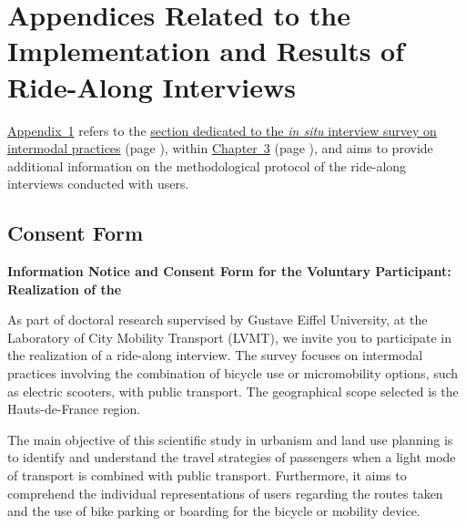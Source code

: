     \setcounter{section}{0}
\chapter{Appendices Related to the Implementation and Results of Ride-Along Interviews}
    \label{annexes:parcours-commentes}

\hyperref[annexes:parcours-commentes]{Appendix~\ref{annexes:parcours-commentes}} refers to the \hyperref[chap3:parcours-commente]{section dedicated to the \textsl{in situ} interview survey on intermodal practices} (page \pageref{chap3:parcours-commente}), within \hyperref[chap3:titre]{Chapter~3} (page \pageref{chap3:titre}), and aims to provide additional information on the methodological protocol of the ride-along interviews conducted with users.%

    \setcounter{tocdepth}{2}
    \renewcommand{\localcontentsname}{Structure of Appendix~\ref{annexes:parcours-commentes}}
\localtableofcontents

    \newpage
\section{Consent Form}
    \label{annexes:consentement-parcours-commentes}

\textbf{Information Notice and Consent Form for the Voluntary Participant: Realization of the }

As part of doctoral research supervised by Gustave Eiffel University, at the Laboratory of City Mobility Transport (\acrshort{LVMT}), we invite you to participate in the realization of a ride-along interview. The survey focuses on intermodal practices involving the combination of bicycle use or micromobility options, such as electric scooters, with public transport. The geographical scope selected is the Hauts-de-France region.%

The main objective of this scientific study in urbanism and land use planning is to identify and understand the travel strategies of passengers when a light mode of transport is combined with public transport. Furthermore, it aims to comprehend the individual representations of users regarding the routes taken and the use of bike parking or boarding for the bicycle or mobility device.%

